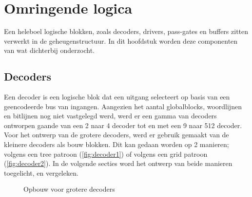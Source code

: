 \chapter{Omringende logica}
\label{periphery}

Een heleboel logische blokken, zoals decoders, drivers, pass-gates en buffers zitten verwerkt in de geheugenstructuur.
In dit hoofdstuk worden deze componenten van wat dichterbij onderzocht.

\section{Decoders}
Een decoder is een logische blok dat een uitgang selecteert op basis van een geencodeerde bus van ingangen. Aangezien het aantal globalblocks, woordlijnen en bitlijnen nog niet vastgelegd werd, werd er een gamma van decoders ontworpen gaande van een 2 naar 4 decoder tot en met een 9 naar 512 decoder. Voor het ontwerp van de grotere decoders, werd er gebruik gemaakt van de kleinere decoders als bouw blokken. Dit kan gedaan worden op 2 manieren; volgens een tree patroon (\ref{fig:decoder1}) of volgens een grid patroon (\ref{fig:decoder2}). In de volgende secties word het ontwerp van beide manieren toegelicht, en vergeleken.

\begin{figure}[h!]
\centering
{}
\caption{Opbouw voor grotere decoders}\label{fig:basisdecoders}
\end{figure}

